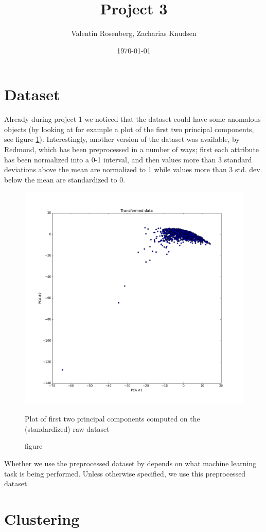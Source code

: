 \documentclass[a4paper,10pt]{article}
\title{Project 3}
\author{Valentin Rosenberg, Zacharias Knudsen}
\date{\today}
\begin{document}
\section{Dataset}
Already during project 1 we noticed that the dataset could have some anomalous objects (by looking at for example a plot of the first two principal components, see figure \ref{fig_pca}). Interestingly, another version of the dataset was available, by Redmond\cite{redmond09}, which has been preprocessed in a number of ways; first each attribute has been normalized into a 0-1 interval, and then values more than 3 standard deviations above the mean are normalized to 1 while values more than 3 std. dev. below the mean are standardized to 0.

\begin{figure}[H]
\centering
  \includegraphics[width=0.7\linewidth]{fig_pca_raw}
  \caption{figure}{Plot of first two principal components computed on the (standardized) raw dataset}
  \label{fig_pca}
\end{figure}

Whether we use the preprocessed dataset by \cite{redmond09} depends on what machine learning task is being performed. Unless otherwise specified, we use this preprocessed dataset.

\section{Clustering}
\end{document}
